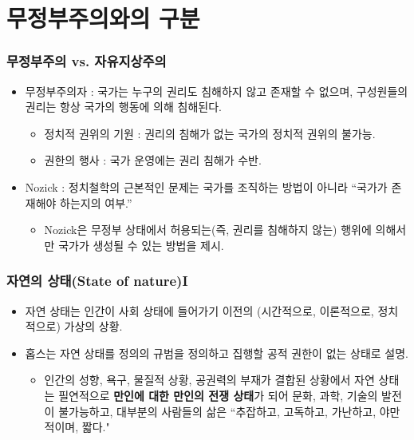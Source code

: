 \documentclass[aspectratio=169,xcolor=dvipsnames,handout]{beamer}
\begin{document}
\section{무정부주의와의 구분}

\begin{frame}[<+->]
\frametitle{무정부주의 vs. 자유지상주의}
    \begin{itemize}
        \item  무정부주의자 : 국가는 누구의 권리도 침해하지 않고 존재할 수 없으며, 구성원들의 권리는 항상 국가의 행동에 의해 침해된다.
        \begin{itemize}
            \item 정치적 권위의 기원 : 권리의 침해가 없는 국가의 정치적 권위의 불가능.
            \item 권한의 행사 : 국가 운영에는 권리 침해가 수반.
        \end{itemize}
        \item Nozick : 정치철학의 근본적인 문제는 국가를 조직하는 방법이 아니라 “국가가 존재해야 하는지의 여부.”
        \begin{itemize}
            \item Nozick은 무정부 상태에서 허용되는(즉, 권리를 침해하지 않는) 행위에 의해서만 국가가 생성될 수 있는 방법을 제시.
        \end{itemize}
    \end{itemize}
\end{frame}

\begin{frame}[<+->]
\frametitle{자연의 상태(State of nature)I}
    \begin{itemize}
        \item 자연 상태는 인간이 사회 상태에 들어가기 이전의 (시간적으로, 이론적으로, 정치적으로) 가상의 상황.
        \item 홉스는 자연 상태를 정의의 규범을 정의하고 집행할 공적 권한이 없는 상태로 설명.
        \begin{itemize}
           \item  인간의 성향, 욕구, 물질적 상황, 공권력의 부재가 결합된 상황에서 자연 상태는 필연적으로 \textbf{만인에 대한 만인의 전쟁 상태}가 되어 문화, 과학, 기술의 발전이 불가능하고, 대부분의 사람들의 삶은 “추잡하고, 고독하고, 가난하고, 야만적이며, 짧다."
        \end{itemize}
    \end{itemize}
\end{frame}
\end{document}
